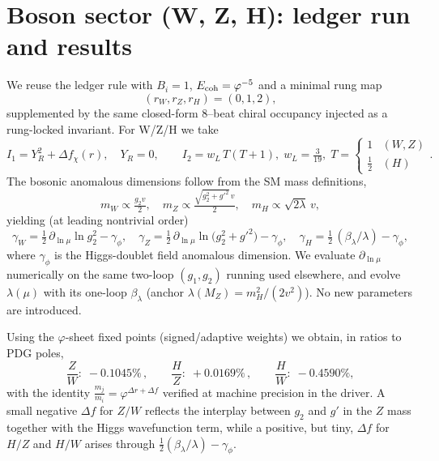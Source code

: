 \documentclass[12pt]{article}
\begin{document}
\section*{Boson sector (W, Z, H): ledger run and results}
We reuse the ledger rule with $B_i=1$, $E_{\rm coh}=\varphi^{-5}$ and a minimal rung map
\[
(r_W,r_Z,r_H)=(0,1,2),
\]
supplemented by the same closed-form 8--beat chiral occupancy injected as a rung-locked invariant. For W/Z/H we take
\[
I_1 = Y_R^2 + \Delta f_\chi(r),\quad Y_R=0,\qquad
I_2 = w_L\,T(T{+}1),\; w_L=\tfrac{3}{19},\; T=\begin{cases}1 & (W,Z)\\[2pt] \tfrac12 & (H)\end{cases}.
\]
The bosonic anomalous dimensions follow from the SM mass definitions,
\[
m_W \propto \tfrac{g_2 v}{2},\quad
m_Z \propto \tfrac{\sqrt{g_2^2+g'^2}\,v}{2},\quad
m_H \propto \sqrt{2\lambda}\,v,
\]
yielding (at leading nontrivial order)
\[
\gamma_W = \tfrac12\,\partial_{\ln\mu}\ln g_2^2 - \gamma_\phi,\quad
\gamma_Z = \tfrac12\,\partial_{\ln\mu}\ln\!\bigl(g_2^2+g'^2\bigr) - \gamma_\phi,\quad
\gamma_H = \tfrac12\,(\beta_\lambda/\lambda) - \gamma_\phi,
\]
where $\gamma_\phi$ is the Higgs-doublet field anomalous dimension. We evaluate $\partial_{\ln\mu}$ numerically on the same two-loop $(g_1,g_2)$ running used elsewhere, and evolve $\lambda(\mu)$ with its one-loop $\beta_\lambda$ (anchor $\lambda(M_Z)=m_H^2/(2v^2)$). No new parameters are introduced.

Using the $\varphi$-sheet fixed points (signed/adaptive weights) we obtain, in ratios to PDG poles,
\[
\frac{Z}{W}:\; -0.1045\%\,,\qquad
\frac{H}{Z}:\; +0.0169\%\,,\qquad
\frac{H}{W}:\; -0.4590\%,
\]
with the identity $\frac{m_j}{m_i}=\varphi^{\Delta r+\Delta f}$ verified at machine precision in the driver. A small negative $\Delta f$ for $Z/W$ reflects the interplay between $g_2$ and $g'$ in the $Z$ mass together with the Higgs wavefunction term, while a positive, but tiny, $\Delta f$ for $H/Z$ and $H/W$ arises through $\tfrac12(\beta_\lambda/\lambda) - \gamma_\phi$.
\end{document}
